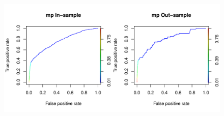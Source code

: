 \documentclass{article}
\begin{document}
\begin{figure}[H]
\includegraphics[width=\textwidth]{fig/roc_mp}
\end{figure}
\end{document}
